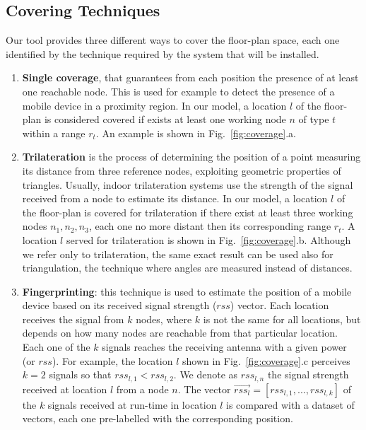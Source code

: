\subsection{Covering Techniques}
\label{subsec:covering}
Our tool provides three different ways to cover the floor-plan space, each one identified by the technique required by the system that will be installed.
\begin{enumerate}[label=\textbf{(\arabic*)}]
\item \textbf{Single coverage}, that guarantees from each position the presence of at least one reachable node. This is used for example to detect the presence of a mobile device in a proximity region. In our model, a location \(l\) of the floor-plan is considered covered if exists at least one working node \(n\) of type \(t\) within a range \(r_t\). An example is shown in Fig.~\ref{fig:coverage}.a.
\item \textbf{Trilateration} is the process of determining the position of a point measuring its distance from three reference nodes, exploiting geometric properties of triangles. Usually, indoor trilateration systems use the strength of the signal received from a node to estimate its distance. In our model, a location \(l\) of the floor-plan is covered for trilateration if there exist at least three working nodes \(n_1, n_2, n_3\), each one no more distant then its corresponding range \(r_t\). A location $l$ served for trilateration is shown in Fig.~\ref{fig:coverage}.b. Although we refer only to trilateration, the same exact result can be used also for triangulation, the technique where angles are measured instead of distances.
\item \textbf{Fingerprinting}: this technique is used to estimate the position of a mobile device based on its received signal strength ($rss$) vector. Each location receives the signal from \(k\) nodes, where \(k\) is not the same for all locations, but depends on how many nodes are reachable from that particular location. Each one of the \(k\) signals reaches the receiving antenna with a given power (or $rss$). For example, the location $l$ shown in Fig.~\ref{fig:coverage}.c perceives $k=2$ signals so that $rss_{l,1} < rss_{l,2}$. We denote as \(rss_{l,n}\) the signal strength received at location \(l\) from a node \(n\). The vector \(\vec{rss_l} = [rss_{l,1}, ..., rss_{l,k}]\) of the \(k\) signals received at run-time in location $l$ is compared with a dataset of vectors, each one pre-labelled with the corresponding position.
\end{enumerate}

